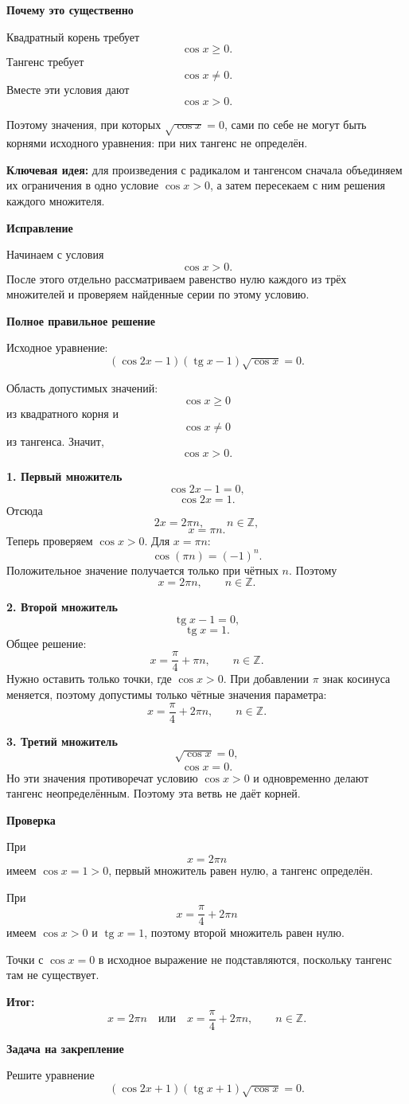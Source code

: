 \documentclass[12pt,a4paper]{article}
\newcommand{\idea}{\textcolor{blue!60!black}{Ключевая идея:}}
\newcommand{\result}{\textcolor{teal!60!black}{Итог:}}
\begin{document}
\textbf{Почему это существенно}

Квадратный корень требует
\[
\cos x\ge 0.
\]
Тангенс требует
\[
\cos x\ne 0.
\]
Вместе эти условия дают
\[
\cos x>0.
\]

Поэтому значения, при которых \(\sqrt{\cos x}=0\), сами по себе не могут быть корнями исходного уравнения: при них тангенс не определён.

\textbf{\idea} для произведения с радикалом и тангенсом сначала объединяем их ограничения в одно условие \(\cos x>0\), а затем пересекаем с ним решения каждого множителя.

\textbf{Исправление}

Начинаем с условия
\[
\cos x>0.
\]
После этого отдельно рассматриваем равенство нулю каждого из трёх множителей и проверяем найденные серии по этому условию.

\textbf{Полное правильное решение}

Исходное уравнение:
\[
(\cos 2x-1)(\operatorname{tg}x-1)\sqrt{\cos x}=0.
\]

Область допустимых значений:
\[
\cos x\ge 0
\]
из квадратного корня и
\[
\cos x\ne 0
\]
из тангенса. Значит,
\[
\cos x>0.
\]

\textbf{1. Первый множитель}
\[
\cos 2x-1=0,
\]
\[
\cos 2x=1.
\]
Отсюда
\[
2x=2\pi n,\qquad n\in\mathbb Z,
\]
\[
x=\pi n.
\]
Теперь проверяем \(\cos x>0\). Для \(x=\pi n\):
\[
\cos(\pi n)=(-1)^n.
\]
Положительное значение получается только при чётных \(n\). Поэтому
\[
x=2\pi n,\qquad n\in\mathbb Z.
\]

\textbf{2. Второй множитель}
\[
\operatorname{tg}x-1=0,
\]
\[
\operatorname{tg}x=1.
\]
Общее решение:
\[
x=\frac{\pi}{4}+\pi n,\qquad n\in\mathbb Z.
\]
Нужно оставить только точки, где \(\cos x>0\). При добавлении \(\pi\) знак косинуса меняется, поэтому допустимы только чётные значения параметра:
\[
x=\frac{\pi}{4}+2\pi n,\qquad n\in\mathbb Z.
\]

\textbf{3. Третий множитель}
\[
\sqrt{\cos x}=0,
\]
\[
\cos x=0.
\]
Но эти значения противоречат условию \(\cos x>0\) и одновременно делают тангенс неопределённым. Поэтому эта ветвь не даёт корней.

\textbf{Проверка}

При
\[
x=2\pi n
\]
имеем \(\cos x=1>0\), первый множитель равен нулю, а тангенс определён.

При
\[
x=\frac{\pi}{4}+2\pi n
\]
имеем \(\cos x>0\) и \(\operatorname{tg}x=1\), поэтому второй множитель равен нулю.

Точки с \(\cos x=0\) в исходное выражение не подставляются, поскольку тангенс там не существует.

\textbf{\result}
\[
\boxed{
x=2\pi n
\quad\text{или}\quad
x=\frac{\pi}{4}+2\pi n,\qquad n\in\mathbb Z.
}
\]

\textbf{Задача на закрепление}

Решите уравнение
\[
(\cos 2x+1)(\operatorname{tg}x+1)\sqrt{\cos x}=0.
\]
\end{document}
